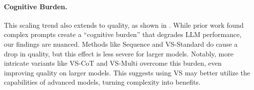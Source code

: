 \paragraph{Cognitive Burden.} This scaling trend also extends to quality, as shown in . While prior work \citep{hu_fine-tuning_2024} found complex prompts create a ``cognitive burden'' that degrades LLM performance, our findings are nuanced. Methods like Sequence and VS-Standard do cause a drop in quality, but this effect is less severe for larger models. Notably, more intricate variants like VS-CoT and VS-Multi overcome this burden, even improving quality on larger models. This suggests using VS may better utilize the capabilities of advanced models, turning complexity into benefits.




